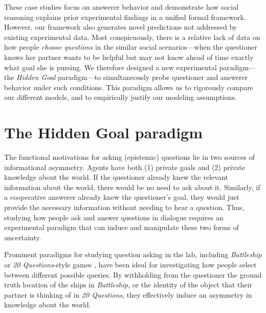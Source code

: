 \documentclass[11pt, floatsintext]{apa6}
\begin{document}

These case studies focus on answerer behavior and demonstrate how social reasoning explains prior experimental findings in a unified formal framework. 
However, our framework also generates novel predictions not addressed by existing experimental data.
Most conspicuously, there is a relative lack of data on how people \emph{choose questions} in the similar social scenarios---when the questioner knows her partner wants to be helpful but may not know ahead of time exactly what goal she is pursing.
We therefore designed a new experimental paradigm---the \emph{Hidden Goal} paradigm---to simultaneously probe questioner and answerer behavior under such conditions.
This paradigm allows us to rigorously compare our different models, and to empirically justify our modeling assumptions.

\section{The Hidden Goal paradigm}

The functional motivations for asking (epistemic) questions lie in two sources of informational asymmetry. 
Agents have both (1) private goals and (2) private knowledge about the world. 
If the questioner already knew the relevant information about the world, there would be no need to ask about it.
Similarly, if a cooperative answerer already knew the questioner's goal, they would just provide the necessary information without needing to hear a question.
Thus, studying how people ask and answer questions in dialogue requires an experimental paradigm that can induce and manipulate these two forms of uncertainty.

Prominent paradigms for studying question asking in the lab, including \emph{Battleship} \cite{RotheEtAl16_NaturalLanguageQuestions, rothe2018people} or \emph{20 Questions}-style games \cite{Siegler77_TwentyQuestions, cohen2016searching, NelsonDivjak___Meder14_GuessWho, RuggeriEtAl15_HierarchicalTwentyQs}, have been ideal for investigating how people select between different possible queries.
By withholding from the questioner the ground truth location of the ships in \emph{Battleship}, or the identity of the object that their partner is thinking of in \emph{20 Questions}, they effectively induce an asymmetry in knowledge about the world.
\end{document}
